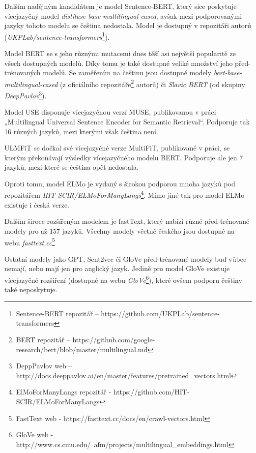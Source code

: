\documentclass[thesis=M,czech]{FITthesis}[2019/12/23]
\begin{document}
Dalším nadějným kandidátem je model Sentence-BERT, který sice poskytuje vícejazyčný model \textit{distiluse-base-multilingual-cased}, avšak mezi podporovanými jazyky tohoto modelu se čeština nedostala. Model je dostupný v repozitáři autorů (\textit{UKPLab/sentence-transformers}\footnote{Sentence-BERT repozitář --  https://github.com/UKPLab/sentence-transformers}).

Model BERT se s jeho různými mutacemi dnes těší asi největší popularitě ze všech dostupných modelů. Díky tomu je také dostupné veliké množství jeho před-trénovaných modelů. Se zaměřením na češtinu jsou dostupné modely \textit{bert-base-multilingual-cased} (z oficiálního repozitáře\footnote{BERT repozitář -- https://github.com/google-research/bert/blob/master/multilingual.md} autorů) či \textit{Slavic BERT} (od skupiny \textit{DeepPavlov}\footnote{DeppPavlov web -- http://docs.deeppavlov.ai/en/master/features/pretrained\_vectors.html}).

Model USE disponuje vícejazyčnou verzí MUSE, publikovanou v práci „Multilingual Universal Sentence Encoder for Semantic Retrieval“\cite{yang2019b}. Podporuje tak 16 různých jazyků, mezi kterými však čeština není.

ULMFiT se dočkal své vícejazyčné verze MultiFiT, publikované v práci\cite{eisenschlos2019}, se kterým překonávají výsledky vícejazyčného modelu BERT. Podporuje ale jen 7 jazyků, mezi které se čeština opět nedostala.

Oproti tomu, model ELMo je vydaný s širokou podporou mnoha jazyků pod repozitářem \textit{HIT-SCIR/ELMoForManyLangs}\footnote{ElMoForManyLangs repozitář - https://github.com/HIT-SCIR/ELMoForManyLangs}. Mimo jiné tak pro model ELMo existuje i česká verze.

Dalším široce rozšířeným modelem je fastText, který nabízí různé před-trénované modely pro až 157 jazyků. Všechny modely včetně českého jsou dostupné na webu \textit{fasttext.cc}\footnote{FastText web - https://fasttext.cc/docs/en/crawl-vectors.html}

Ostatní modely jako GPT, Sent2vec či GloVe před-trénované modely buď vůbec nemají, nebo mají jen pro anglický jazyk. Jedině pro model GloVe existuje vícejazyčné rozšíření (dostupné na webu \textit{GloVe}\footnote{GloVe web - http://www.cs.cmu.edu/~afm/projects/multilingual\_embeddings.html}), které ovšem podporu češtiny také neposkytuje.
\end{document}
